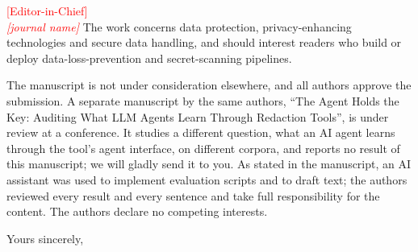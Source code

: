 \documentclass[10pt]{letter}
\newcommand{\Venue}{\textcolor{red}{[journal name]}}
\newcommand{\Editor}{\textcolor{red}{[Editor-in-Chief]}}
\begin{document}
\begin{letter}{\Editor\\ \emph{\Venue}}
The work concerns data protection, privacy-enhancing technologies and secure data handling, and should interest readers who build or deploy data-loss-prevention and secret-scanning pipelines.

The manuscript is not under consideration elsewhere, and all authors approve the submission. A separate manuscript by the same authors, ``The Agent Holds the Key: Auditing What LLM Agents Learn Through Redaction Tools'', is under review at a conference. It studies a different question, what an AI agent learns through the tool's agent interface, on different corpora, and reports no result of this manuscript; we will gladly send it to you. As stated in the manuscript, an AI assistant was used to implement evaluation scripts and to draft text; the authors reviewed every result and every sentence and take full responsibility for the content. The authors declare no competing interests.

\closing{Yours sincerely,}

\end{letter}
\end{document}

